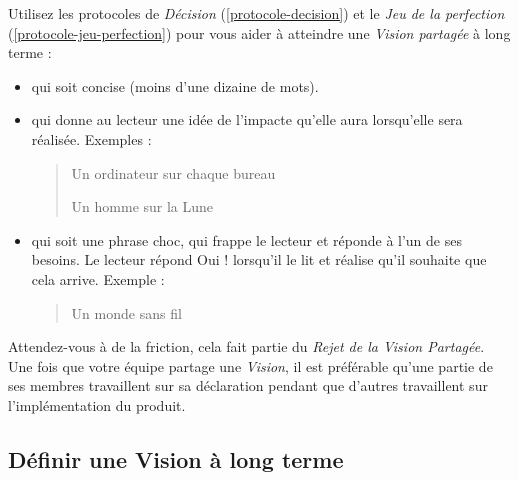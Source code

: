 \documentclass[11pt]{book}
\newcommand*{\numref}[1]{{\hyperref[{#1}]{\autoref*{#1}}}}
\begin{document}
Utilisez les protocoles de \emph{Décision} (\numref{protocole-decision}) et le \emph{Jeu de la perfection} (\numref{protocole-jeu-perfection})
pour vous aider à atteindre une \emph{Vision partagée} à long terme :
\begin{itemize}
	\item qui soit concise (moins d'une dizaine de mots).
	\item qui donne au lecteur une idée de l'impacte qu'elle aura lorsqu'elle sera réalisée. Exemples :
		  \begin{quote}
		  	\og{}Un ordinateur sur chaque bureau\fg{}
		  	
		  	\og{}Un homme sur la Lune\fg{}
		  \end{quote}
	\item qui soit une phrase \og{}choc\fg{}, qui frappe le lecteur et réponde à l'un de ses besoins. Le lecteur répond \og{}Oui !\fg{}
	      lorsqu'il le lit et réalise qu'il souhaite que cela arrive. Exemple :
	      \begin{quote}
	      	\og{}Un monde sans fil\fg{}
	      \end{quote}
\end{itemize}

Attendez-vous à de la friction, cela fait partie du \emph{Rejet de la Vision Partagée}. Une fois que votre équipe partage une 
\emph{Vision}, il est préférable qu'une partie de ses membres travaillent sur sa déclaration pendant que d'autres travaillent sur 
l'implémentation du produit. 

\subsection{Définir une Vision à long terme}
\end{document}
